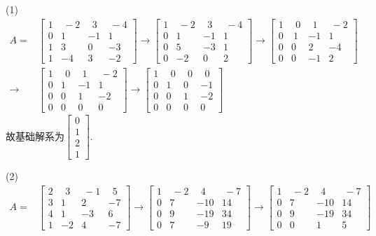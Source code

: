 (1)\begin{displaymath}
\begin{aligned}
A=&\begin{bmatrix}1&\ -2&\ \ 3&\ -4\\0&1&-1&1\\1&3&0&-3\\1&-4&3&-2   \end{bmatrix}\rightarrow
\begin{bmatrix} 1&\ -2&\ \ 3&\ -4\\0&1&-1&1\\0&5&-3&1\\0&-2&0&2  \end{bmatrix}\rightarrow
\begin{bmatrix}1&\ \ 0&\ \ 1&\ -2\\0&\  1&-1&1\\0&0&2&-4\\0&0&-1&2   \end{bmatrix}\\ \rightarrow &
\begin{bmatrix}1&\ \ 0&\ \ 1&\ -2\\0&1&-1&1\\0&0&1&-2\\0&0&0&0   \end{bmatrix}\rightarrow
\begin{bmatrix}1&\ \ 0&\ \ 0&\ \ 0\\0&1&0&-1\\0&0&1&-2\\0&0&0&0   \end{bmatrix} \end{aligned} \end{displaymath}
故基础解系为$\begin{bmatrix}0\\1\\2\\1\end{bmatrix}$.

(2)
\begin{displaymath}
\begin{aligned}
A=&\begin{bmatrix}2&\ \ 3&\ -1&\ \ 5\\3&1&2&-7\\4&1&-3&6\\1&-2&4&-7   \end{bmatrix}\rightarrow
\begin{bmatrix}1&\ -2&\ \ 4&\ -7\\0&7&-10&14\\0&9&-19&34\\0&7&-9&19    \end{bmatrix}\rightarrow
\begin{bmatrix}1&\ -2&\ \ 4&\ -7\\0&7&-10&14\\0&9&-19&34\\0&0&1&5    \end{bmatrix}\end{aligned} \end{displaymath}

